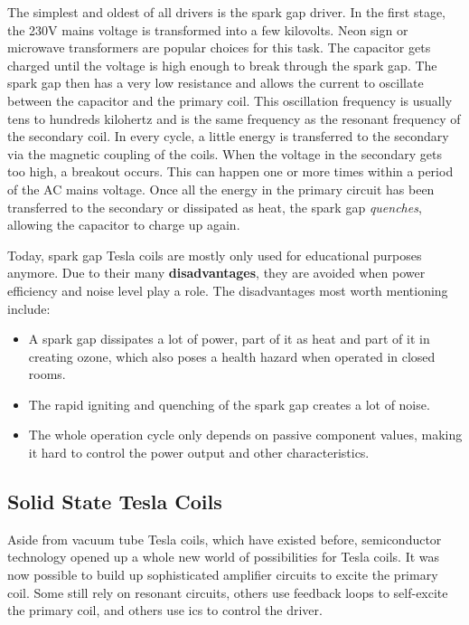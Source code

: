The simplest and oldest of all drivers is the spark gap driver. In the first stage, the 230V mains voltage is transformed into a few kilovolts. Neon sign or microwave transformers are popular choices for this task. The capacitor gets charged until the voltage is high enough to break through the spark gap. The spark gap then has a very low resistance and allows the current to oscillate between the capacitor and the primary coil. This oscillation frequency is usually tens to hundreds kilohertz and is the same frequency as the resonant frequency of the secondary coil. In every cycle, a little energy is transferred to the secondary via the magnetic coupling of the coils. When the voltage in the secondary gets too high, a breakout occurs. This can happen one or more times within a period of the AC mains voltage. Once all the energy in the primary circuit has been transferred to the secondary or dissipated as heat, the spark gap \emph{quenches}, allowing the capacitor to charge up again.

Today, spark gap Tesla coils are mostly only used for educational purposes anymore. Due to their many \textbf{disadvantages}, they are avoided when power efficiency and noise level play a role. The disadvantages most worth mentioning include:

\begin{itemize}
\item A spark gap dissipates a lot of power, part of it as heat and part of it in creating ozone, which also poses a health hazard when operated in closed rooms.
\item The rapid igniting and quenching of the spark gap creates a lot of noise.
\item The whole operation cycle only depends on passive component values, making it hard to control the power output and other characteristics.
\end{itemize}

\subsection{Solid State Tesla Coils}

Aside from vacuum tube Tesla coils, which have existed before, semiconductor technology opened up a whole new world of possibilities for Tesla coils. It was now possible to build up sophisticated amplifier circuits to excite the primary coil. Some still rely on resonant circuits, others use feedback loops to self-excite the primary coil, and others use \glspl{ic} to control the driver.

